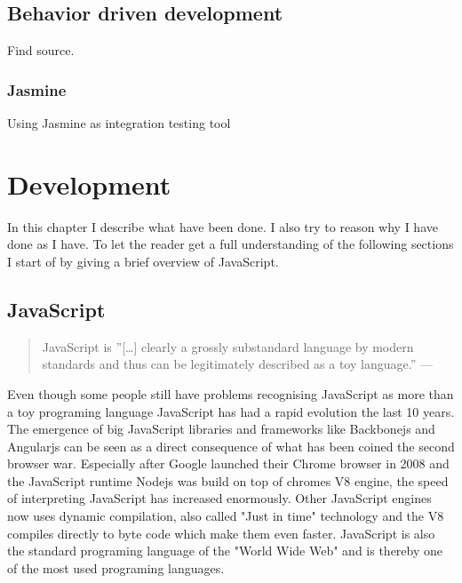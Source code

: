\documentclass[english]{ifimaster}
\begin{document}
\section{Behavior driven development}
Find source.

\subsection{Jasmine}
Using Jasmine as integration testing tool

\chapter{Development}
In this chapter I describe what have been done. I also try to reason why I have done as I have. To let the reader get a full understanding of the following sections I start of by giving a brief overview of JavaScript.

\section{JavaScript}

\begin{quotation}
\noindent JavaScript is ”[…] clearly a grossly substandard language by modern
standards and thus can be legitimately described as a toy language.” —
\parencite{arno}
\end{quotation}

Even though some people still have problems recognising JavaScript as more than a toy programing language JavaScript has had a rapid evolution the last 10 years. The emergence of  big JavaScript libraries and frameworks like Backbonejs and Angularjs can be seen as a direct consequence of what has been coined the second browser war\parencite{Yule2013}. Especially after Google launched their Chrome browser in 2008 and the JavaScript runtime Nodejs was build on top of chromes V8 engine, the speed of interpreting JavaScript has increased enormously. Other JavaScript engines now uses dynamic compilation, also called "Just in time" technology and the V8 compiles directly to byte code which make them even faster\parencite{anand}. JavaScript is also the standard programing language of the "World Wide Web"\parencite[p. 1]{flanagan} and is thereby one of the most used programing languages.
\end{document}
